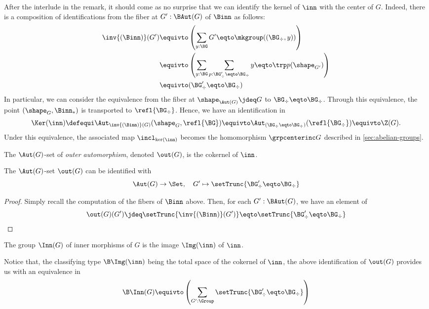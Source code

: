 After the interlude in the remark, it should come as no surprise that we can
identify the kernel of $\inn$ with the center of $G$. Indeed, there is a
composition of identifications from the fiber at $G':\BAut(G)$ of $\Binn$ as
follows:
\begin{align*}
  \inv{(\Binn)} (G') &\equivto \left(  \sum_{y:\BG}G' \eqto \mkgroup((\BG_\div,y)) \right)
  \\
  &\equivto \left( \sum_{y:\BG}\sum_{p:\BG'_\div \eqto \BG_\div} y \eqto \trp p (\shape_{G'}) \right)
  \\
  &\equivto (\BG'_\div \eqto \BG_\div)
\end{align*}
In particular, we can consider the equivalence from the fiber at
$\shape_{\Aut(G)} \jdeq G$ to $\BG_\div \eqto \BG_\div$. Through this
equivalence, the point $(\shape_G,\Binn_{\ast})$ is transported to
$\refl{\BG_\div}$. Hence, we have an identification in
\begin{displaymath}
  \Ker(\inn) \defequi \Aut_{\inv{(\Binn)} (G)}(\shape_G, \refl{\BG})
  \equivto \Aut_{(\BG_\div \eqto \BG_\div)}(\refl{\BG_\div})
  \equivto \Z(G).
\end{displaymath}
Under this equivalence, the associated map $\incl_{\ker(\inn)}$ becomes the
homomorphism $\grpcenterinc G$ described in \cref{sec:abelian-groups}.

\newcommand{\outaut}{\constant{out}}%
\begin{definition}
  The $\Aut(G)$-set of {\em outer automorphism}, denoted $\out(G)$, is the
  cokernel of $\inn$.
\end{definition}
\begin{lemma}\label{lemma:coker-out-action}%
  The $\Aut(G)$-set $\out(G)$ can be identified with
  \begin{displaymath}
    \Aut(G) \to \Set, \quad G' \mapsto \setTrunc{\BG'_\div \eqto \BG_\div}
  \end{displaymath}
\end{lemma}
\begin{proof}
  Simply recall the computation of the fibers of $\Binn$ above. Then, for each
  $G':\BAut(G)$, we have an element of
  \begin{displaymath}
    \out(G)(G') \jdeq \setTrunc{\inv{(\Binn)}(G')} \eqto \setTrunc{\BG'_\div \eqto \BG_\div}
  \end{displaymath}
\end{proof}

\begin{definition}
  The group $\Inn(G)$ of inner morphisms of $G$ is the image $\Img (\inn)$ of
  $\inn$.
\end{definition}
Notice that, the classifying type $\B\Img(\inn)$ being the total space of the
cokernel of $\inn$, the above identification of $\out(G)$ provides us with an
equivalence in
\begin{displaymath}
  \B\Inn(G) \equivto \left( \sum_{G':\Group} \setTrunc{\BG'_\div \eqto \BG_\div} \right)
\end{displaymath}

